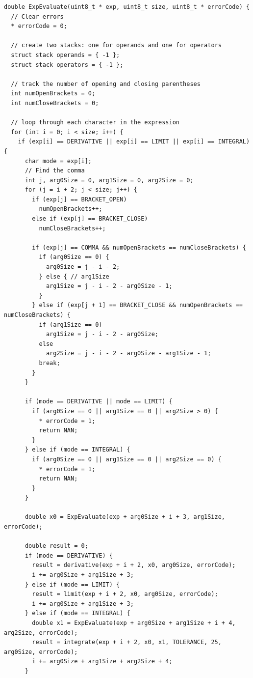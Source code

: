 \documentclass[a4paper, twoside]{report}
\begin{document}
\begin{verbatim}
double ExpEvaluate(uint8_t * exp, uint8_t size, uint8_t * errorCode) {
  // Clear errors
  * errorCode = 0;

  // create two stacks: one for operands and one for operators
  struct stack operands = { -1 };
  struct stack operators = { -1 };

  // track the number of opening and closing parentheses
  int numOpenBrackets = 0;
  int numCloseBrackets = 0;

  // loop through each character in the expression
  for (int i = 0; i < size; i++) {
    if (exp[i] == DERIVATIVE || exp[i] == LIMIT || exp[i] == INTEGRAL) {
      char mode = exp[i];
      // Find the comma
      int j, arg0Size = 0, arg1Size = 0, arg2Size = 0;
      for (j = i + 2; j < size; j++) {
        if (exp[j] == BRACKET_OPEN)
          numOpenBrackets++;
        else if (exp[j] == BRACKET_CLOSE)
          numCloseBrackets++;

        if (exp[j] == COMMA && numOpenBrackets == numCloseBrackets) {
          if (arg0Size == 0) {
            arg0Size = j - i - 2;
          } else { // arg1Size
            arg1Size = j - i - 2 - arg0Size - 1;
          }
        } else if (exp[j + 1] == BRACKET_CLOSE && numOpenBrackets == numCloseBrackets) {
          if (arg1Size == 0)
            arg1Size = j - i - 2 - arg0Size;
          else
            arg2Size = j - i - 2 - arg0Size - arg1Size - 1;
          break;
        }
      }

      if (mode == DERIVATIVE || mode == LIMIT) {
        if (arg0Size == 0 || arg1Size == 0 || arg2Size > 0) {
          * errorCode = 1;
          return NAN;
        }
      } else if (mode == INTEGRAL) {
        if (arg0Size == 0 || arg1Size == 0 || arg2Size == 0) {
          * errorCode = 1;
          return NAN;
        }
      }

      double x0 = ExpEvaluate(exp + arg0Size + i + 3, arg1Size, errorCode);

      double result = 0;
      if (mode == DERIVATIVE) {
        result = derivative(exp + i + 2, x0, arg0Size, errorCode);
        i += arg0Size + arg1Size + 3;
      } else if (mode == LIMIT) {
        result = limit(exp + i + 2, x0, arg0Size, errorCode);
        i += arg0Size + arg1Size + 3;
      } else if (mode == INTEGRAL) {
        double x1 = ExpEvaluate(exp + arg0Size + arg1Size + i + 4, arg2Size, errorCode);
        result = integrate(exp + i + 2, x0, x1, TOLERANCE, 25, arg0Size, errorCode);
        i += arg0Size + arg1Size + arg2Size + 4;
      }


\end{verbatim}
\end{document}

